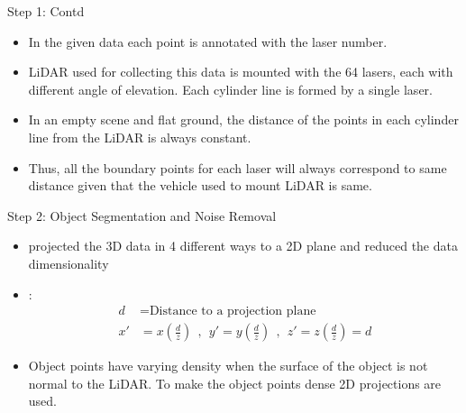 \documentclass[9pt]{beamer}
\begin{document}
\begin{frame}[fragile]{Step 1: Contd}
	\begin{itemize}
		\item In the given data each point is annotated with the laser number.
		\item LiDAR used for collecting this data is mounted with the 64 lasers, each with different angle of elevation. Each cylinder line is formed by a single laser.
		\item In an empty scene and flat ground, the distance of the points in each cylinder line from the LiDAR is always constant.
		\item Thus, all the boundary points for each laser will always correspond to same distance given that the vehicle used to mount LiDAR is same.
	\end{itemize}
\end{frame}


\begin{frame}[fragile]{Step 2: Object Segmentation and Noise Removal}
	\begin{itemize}
		\item {} projected the 3D data in 4 different ways to a 2D plane and reduced the data dimensionality

		\item {}:
		\begin{align*}
		d  & = \text{Distance to a projection plane} \\
		x' & =  x (\frac{d}{z}) \ \  , \ \  y' =  y (\frac{d}{z}) \ \  , \ \  z'=  z (\frac{d}{z}) = d
		\end{align*}

		\item Object points have varying density when the surface of the object is not normal to the LiDAR. To make the object points dense 2D projections are used.
	\end{itemize}
\end{frame}


\end{document}
